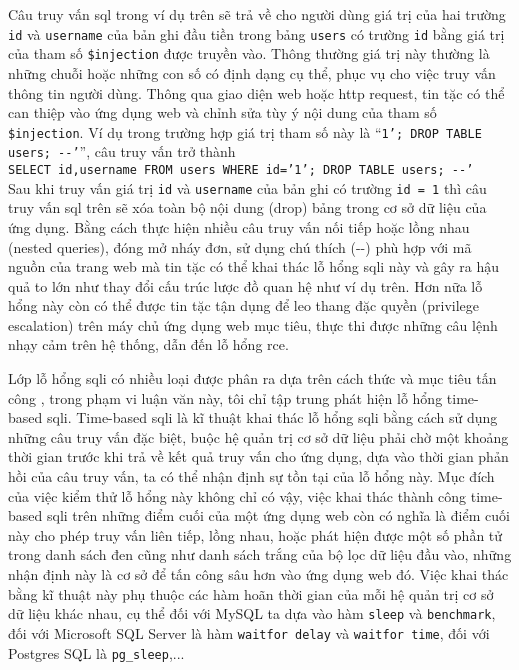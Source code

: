 Câu truy vấn \acrshort{sql} trong ví dụ trên sẽ trả về cho người dùng giá trị của hai trường \texttt{id} và \texttt{username} của bản ghi đầu tiền trong bảng \texttt{users} có trường \texttt{id} bằng giá trị của tham số \texttt{\$injection} được truyền vào. Thông thường giá trị này thường là những chuỗi hoặc những con số có định dạng cụ thể, phục vụ cho việc truy vấn thông tin người dùng. Thông qua giao diện web hoặc \acrshort{http} request, tin tặc có thể can thiệp vào ứng dụng web và chỉnh sửa tùy ý nội dung của tham số \texttt{\$injection}. Ví dụ trong trường hợp giá trị tham số này là ``\colorbox{gray!30}{\texttt{1'; DROP TABLE users; -{}-'}}'', câu truy vấn trở thành\\
\colorbox{gray!30}{\texttt{SELECT id,username FROM users WHERE id='1'; DROP TABLE users; -{}-'}}\\
Sau khi truy vấn giá trị \texttt{id} và \texttt{username} của bản ghi có trường \texttt{id = 1} thì câu truy vấn \acrshort{sql} trên sẽ xóa toàn bộ nội dung (drop) bảng  trong cơ sở dữ liệu của ứng dụng. Bằng cách  thực hiện nhiều câu truy vấn nối tiếp hoặc lồng nhau (nested queries), đóng mở nháy đơn, sử dụng chú thích (-{}-) phù hợp với mã nguồn của trang web mà tin tặc có thể khai thác lỗ hổng \acrshort{sqli} này và gây ra hậu quả to lớn như thay đổi cấu trúc lược đồ quan hệ như ví dụ trên. Hơn nữa lỗ hổng này còn có thể được tin tặc tận dụng để leo thang đặc quyền (privilege escalation) trên máy chủ ứng dụng web mục tiêu, thực thi được những câu lệnh nhạy cảm trên hệ thống, dẫn đến lỗ hổng \acrshort{rce}.\par
Lớp lỗ hổng \acrshort{sqli} có nhiều loại được phân ra dựa trên cách thức và mục tiêu tấn công \parencite{sqli-classification}, trong phạm vi luận văn này, tôi chỉ tập trung phát hiện lỗ hổng time-based \acrshort{sqli}. Time-based \acrshort{sqli} là kĩ thuật khai thác lỗ hổng \acrshort{sqli} bằng cách sử dụng những câu truy vấn đặc biệt, buộc hệ quản trị cơ sở dữ liệu phải chờ một khoảng thời gian trước khi trả về kết quả truy vấn cho ứng dụng, dựa vào thời gian phản hồi của câu truy vấn, ta có thể nhận định sự tồn tại của lỗ hổng này. Mục đích của việc kiểm thử lỗ hổng này không chỉ có vậy, việc khai thác thành công time-based \acrshort{sqli} trên những điểm cuối của một ứng dụng web còn có nghĩa là điểm cuối này cho phép truy vấn liên tiếp, lồng nhau, hoặc phát hiện được một số phần tử trong danh sách đen cũng như danh sách trắng của bộ lọc dữ liệu đầu vào, những nhận định này là cơ sở để tấn công sâu hơn vào ứng dụng web đó. Việc khai thác bằng kĩ thuật này phụ thuộc các hàm hoãn thời gian của mỗi hệ quản trị cơ sở dữ liệu khác nhau, cụ thể đối với MySQL ta dựa vào hàm \texttt{sleep} và \texttt{benchmark}, đối với Microsoft SQL Server là hàm \texttt{waitfor delay} và \texttt{waitfor time}, đối với Postgres SQL là \texttt{pg\_sleep},...
